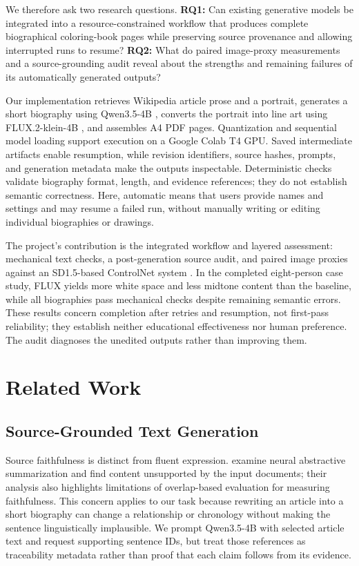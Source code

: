 \documentclass[11pt]{article}
\begin{document}
We therefore ask two research questions. \textbf{RQ1:} Can existing generative models be integrated into a resource-constrained workflow that produces complete biographical coloring-book pages while preserving source provenance and allowing interrupted runs to resume? \textbf{RQ2:} What do paired image-proxy measurements and a source-grounding audit reveal about the strengths and remaining failures of its automatically generated outputs?

Our implementation retrieves Wikipedia article prose and a portrait, generates a short biography using Qwen3.5-4B \citep{qwen35-4b-model-card}, converts the portrait into line art using FLUX.2-klein-4B \citep{flux2-klein-4b-model-card}, and assembles A4 PDF pages. Quantization and sequential model loading support execution on a Google Colab T4 GPU. Saved intermediate artifacts enable resumption, while revision identifiers, source hashes, prompts, and generation metadata make the outputs inspectable. Deterministic checks validate biography format, length, and evidence references; they do not establish semantic correctness. Here, automatic means that users provide names and settings and may resume a failed run, without manually writing or editing individual biographies or drawings.

The project's contribution is the integrated workflow and layered assessment: mechanical text checks, a post-generation source audit, and paired image proxies against an SD1.5-based ControlNet system \citep{zhang-etal-2023-controlnet}. In the completed eight-person case study, FLUX yields more white space and less midtone content than the baseline, while all biographies pass mechanical checks despite remaining semantic errors. These results concern completion after retries and resumption, not first-pass reliability; they establish neither educational effectiveness nor human preference. The audit diagnoses the unedited outputs rather than improving them.

\section{Related Work}
\label{sec:related-work}

\subsection{Source-Grounded Text Generation}

Source faithfulness is distinct from fluent expression. \citet{maynez-etal-2020-faithfulness} examine neural abstractive summarization and find content unsupported by the input documents; their analysis also highlights limitations of overlap-based evaluation for measuring faithfulness. This concern applies to our task because rewriting an article into a short biography can change a relationship or chronology without making the sentence linguistically implausible. We prompt Qwen3.5-4B with selected article text and request supporting sentence IDs, but treat those references as traceability metadata rather than proof that each claim follows from its evidence.
\end{document}

